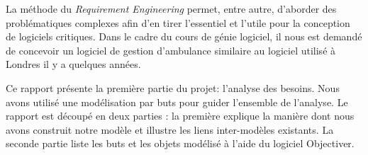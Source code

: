 La méthode du \textit{Requirement Engineering} permet, entre autre, 
d'aborder des  problématiques complexes afin d'en tirer l'essentiel et l'utile pour la 
conception de logiciels critiques. Dans le cadre du cours de génie logiciel, il
nous est demandé de concevoir un logiciel de gestion d'ambulance similaire
au logiciel utilisé à Londres il y a quelques années.

Ce rapport présente la première partie du projet: l'analyse des besoins. Nous
avons utilisé une modélisation par buts pour guider l'ensemble de l'analyse.
Le rapport est découpé en deux parties : la première explique la manière
dont nous avons construit notre modèle et illustre les liens inter-modèles
existants. La seconde partie liste les buts et les objets modélisé à l'aide
du logiciel Objectiver.
